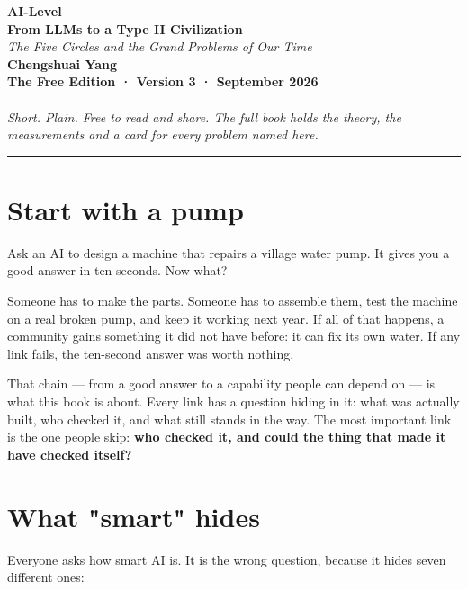 \documentclass[11pt]{article}
\begin{document}
\begin{center}
{\LARGE\bfseries AI-Level}\\[6pt]
{\Large\bfseries From LLMs to a Type II Civilization}\\[4pt]
{\large\itshape The Five Circles and the Grand Problems of Our Time}\\[10pt]
\textbf{Chengshuai Yang}\\[2pt]
\textbf{The Free Edition · Version 3 · September 2026}\\[2pt]
\\[4pt]\emph{Short. Plain. Free to read and share. The full book holds the theory, the measurements and a card for every problem named here.}\\[14pt]
\end{center}
\medskip\noindent\rule{\textwidth}{0.3pt}\medskip

\section*{Start with a pump}

Ask an AI to design a machine that repairs a village water pump. It gives you a good answer in ten seconds. Now what?

Someone has to make the parts. Someone has to assemble them, test the machine on a real broken pump, and keep it working next year. If all of that happens, a community gains something it did not have before: it can fix its own water. If any link fails, the ten-second answer was worth nothing.

That chain --- from a good answer to a capability people can depend on --- is what this book is about. Every link has a question hiding in it: what was actually built, who checked it, and what still stands in the way. The most important link is the one people skip: \textbf{who checked it, and could the thing that made it have checked itself?}

\section*{What "smart" hides}

Everyone asks how smart AI is. It is the wrong question, because it hides seven different ones:
\end{document}
